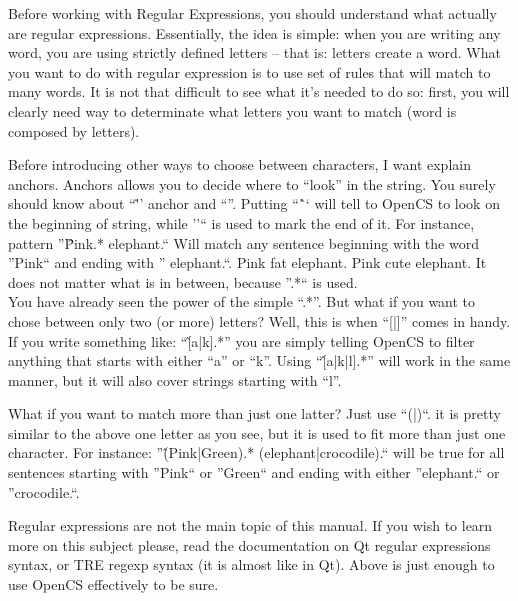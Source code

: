 Before working with Regular Expressions, you should understand what actually are regular expressions. Essentially, the idea is simple:
when you are writing any word, you are using strictly defined letters -- that is: letters create a word. What you want to do with regular
expression is to use set of rules that will match to many words. It is not that difficult to see what it's needed to do so: first,
you will clearly need way to determinate what letters you want to match (word is composed by letters).

Before introducing other ways to choose between characters, I want explain anchors. Anchors allows you to decide where to ``look'' in the string.
You surely should know about ``\^'' anchor and ``\textdollar''. Putting ``\^`` will tell to Open{CS} to look on the beginning of string,
while ''\textdollar`` is used to mark the end of it. For instance, pattern ''\^Pink.* elephant.\textdollar`` Will match any sentence beginning
with the word ''Pink`` and ending with '' elephant.``. Pink fat elephant. Pink cute elephant. It does not matter what is in between, 
because ''.*`` is used.\\

You have already seen the power of the simple ``.*''. But what if you want to chose between only two (or more) letters? Well, this is when
``[|]'' comes in handy. If you write something like: ``\^[a|k].*'' you are simply telling Open{CS} to filter anything that starts with either
``a'' or ``k''. Using ``\^[a|k|l].*'' will work in the same manner, but it will also cover strings starting with ``l''.

What if you want to match more than just one latter? Just use ``(|)``. it is pretty similar to the above one letter as you see, but it is
used to fit more than just one character. For instance: ''\^(Pink|Green).* (elephant|crocodile).\textdollar`` will be true for all sentences
starting with ''Pink`` or ''Green`` and ending with either ''elephant.`` or ''crocodile.``.

Regular expressions are not the main topic of this manual. If you wish to learn more on this subject please, read the documentation on
Qt regular expressions syntax, or TRE regexp syntax (it is almost like in Qt). Above is just enough to use Open{CS} effectively to be sure.

